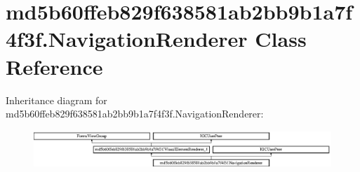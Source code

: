 \hypertarget{classmd5b60ffeb829f638581ab2bb9b1a7f4f3f_1_1NavigationRenderer}{}\section{md5b60ffeb829f638581ab2bb9b1a7f4f3f.\+Navigation\+Renderer Class Reference}
\label{classmd5b60ffeb829f638581ab2bb9b1a7f4f3f_1_1NavigationRenderer}
Inheritance diagram for md5b60ffeb829f638581ab2bb9b1a7f4f3f.\+Navigation\+Renderer\+:\begin{figure}[H]
\begin{center}
\leavevmode
\includegraphics[height=1.403509cm]{classmd5b60ffeb829f638581ab2bb9b1a7f4f3f_1_1NavigationRenderer}
\end{center}
\end{figure}
